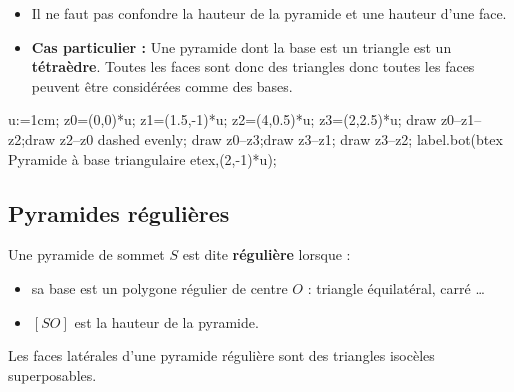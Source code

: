\begin{remarques}
    \phantom{rrr}

    \begin{minipage}{0.65\linewidth}
    \begin{itemize}
        \item Il ne faut pas confondre la hauteur de la pyramide et une hauteur d'une face.
        \item {\bf Cas particulier : } Une pyramide dont la base est un triangle est un {\bf tétraèdre}. Toutes les faces sont donc des triangles donc toutes les faces peuvent être considérées comme des bases.        
    \end{itemize}
    \end{minipage}
    \hspace*{15mm}
    \begin{minipage}{0.3\linewidth}
        \begin{center}
            \begin{Geometrie}[CoinBG={(-0.5u,-2u)}]
                u:=1cm;
                z0=(0,0)*u;
                z1=(1.5,-1)*u;
                z2=(4,0.5)*u;
                z3=(2,2.5)*u;
                draw z0--z1--z2;draw z2--z0 dashed evenly;
                draw z0--z3;draw z3--z1; draw z3--z2;
                label.bot(btex Pyramide à base triangulaire etex,(2,-1)*u);
            \end{Geometrie}
        \end{center}
    \end{minipage}
\end{remarques}

\subsection{Pyramides régulières}
\begin{definition}Une pyramide de sommet $S$ est dite {\bf régulière} lorsque :
    \begin{itemize}
        \item sa base est un polygone régulier de centre $O$ : triangle équilatéral, carré \ldots
        \item $\left[SO\right]$ est la hauteur de la pyramide.
    \end{itemize}

    \begin{remarque}
        Les faces latérales d'une pyramide régulière sont des triangles isocèles superposables.
    \end{remarque}
\end{definition}

